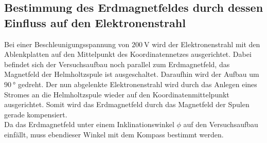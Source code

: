 \subsection{Bestimmung des Erdmagnetfeldes durch dessen Einfluss auf den Elektronenstrahl}
Bei einer Beschleunigungsspannung von $\SI{200}{\volt}$ wird der Elektronenstrahl mit den Ablenkplatten auf den Mittelpunkt des Koordinatennetzes ausgerichtet.
Dabei befindet sich der Versuchsaufbau noch parallel zum Erdmagnetfeld, das Magnetfeld der Helmholtzspule ist ausgeschaltet.
Daraufhin wird der Aufbau um $\SI{90}{\degree}$ gedreht.
Der nun abgelenkte Elektronenstrahl wird durch das Anlegen eines Stromes an die Helmholtzspule wieder auf den Koordinatenmittelpunkt ausgerichtet.
Somit wird das Erdmagnetfeld durch das Magnetfeld der Spulen gerade kompensiert.\\
Da das Erdmagnetfeld unter einem Inklinationswinkel $\phi$ auf den Versuchsaufbau einfällt, muss ebendieser Winkel mit dem Kompass bestimmt werden.
